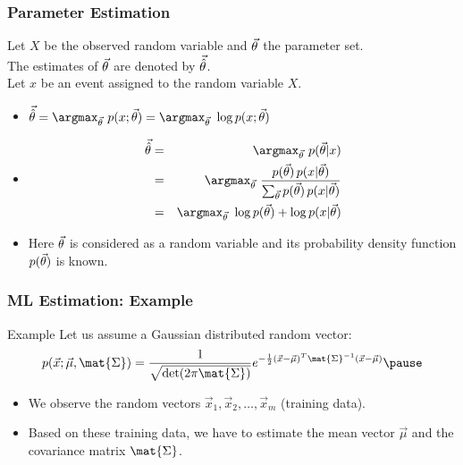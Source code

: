 \begin{frame}
  \frametitle{Parameter Estimation}

  Let $X$ be the observed random variable and $\vec{\theta}$ the parameter set. \\
  The estimates of $\vec{\theta}$ are denoted by $\vec{\hat{\theta}}$. \\
  Let $x$ be an event assigned to the random variable $X$. \\[.25cm] \pause 
%
  \begin{itemize}
    \item {} $\displaystyle \hatp= \argmax_{\p}\ p(x; \p) = \argmax_{\p}\ \log p(x; \p)$  \\[.25cm] \pause 
    \item {}
      {\small
        \begin{eqnarray*}
          \hatp &=& \argmax_{\p}\ p(\p|{x})\\
                &=& \argmax_{\p}\ \frac{p(\p)\,p(x|\p)}
                                       {\sum_{\p} p(\p)\,p(x|\p)} \\
                &=& \argmax_{\p}\ \log p(\p) + \log p(x|\p)
        \end{eqnarray*}
      }
    \item[] Here $\vec{\theta}$ is considered as a random variable and its probability density function $p(\vec{\theta})$ is known.
  \end{itemize}
\end{frame}


\begin{frame}
  \frametitle{ML Estimation: Example}

  \begin{ovalblock}{Example}
    Let us assume a Gaussian distributed random vector:
%
    \begin{displaymath}
      p(\vec{x};\vec{\mu}, \mat{\Sigma}) = \frac{1}{\sqrt{\det(2\pi\mat{\Sigma})}}
        e^{-\frac{1}{2}(\vec{x}-\vec{\mu})^T \mat{\Sigma}^{-1} (\vec{x}-\vec{\mu})} \pause
    \end{displaymath}
%    
    \begin{itemize}
      \item We observe the random vectors $\vec{x}_1, \vec{x}_2, \dots, \vec{x}_m$ (training data). \pause
      \item Based on these training data, we have to estimate the mean vector $\vec{\mu}$ and the covariance matrix $\mat{\Sigma}$.
    \end{itemize}
  \end{ovalblock}
\end{frame}


